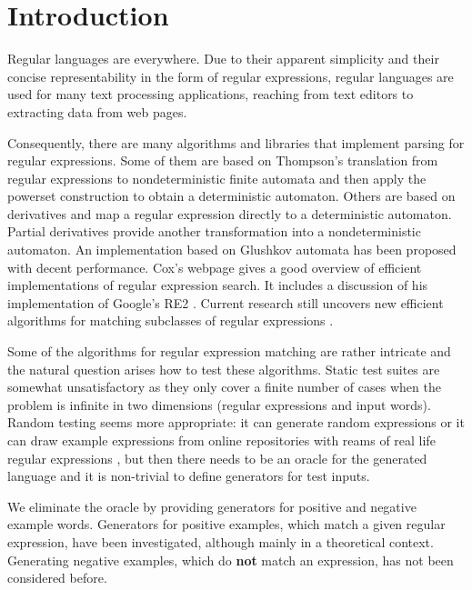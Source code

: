 \section{Introduction}

Regular languages are everywhere. Due to their apparent simplicity and
their concise representability in the form of regular expressions,
regular languages are used for many text processing
applications, reaching from text editors
\cite{DBLP:journals/cacm/Thompson68} to extracting data from web
pages.

Consequently, there are many algorithms and libraries that implement
parsing for regular expressions. Some of them are based on Thompson's
translation from regular expressions to nondeterministic finite
automata and then apply the powerset construction to obtain a
deterministic automaton. Others are based on derivatives
\cite{Brzozowski1964} and
map a regular expression directly to a deterministic
automaton. Partial derivatives \cite{Antimirov96Partial}
provide another transformation into a nondeterministic automaton. An
implementation based on Glushkov automata has been proposed
\cite{DBLP:conf/icfp/FischerHW10} with decent performance.
Cox's webpage \cite{cox07:_implem_regul_expres} gives a good overview
of efficient implementations of regular expression search. It includes
a discussion of his implementation of Google's RE2 \cite{cox10:_regul_expres_match_wild}.
Current research still uncovers new efficient algorithms for matching
subclasses of regular expressions \cite{DBLP:journals/jcss/GrozM17}.

Some of the algorithms for regular expression matching are rather
intricate and the natural question arises how to test these
algorithms. Static test suites are somewhat unsatisfactory as they
only cover a finite number of cases when the problem is infinite in
two dimensions (regular expressions and input words). Random testing
seems more appropriate: it can generate random expressions or it can
draw example expressions from online repositories with reams of real
life regular expressions \cite{regul_expres_librar}, but then there
needs to be an oracle for the generated language and it is non-trivial
to define generators for test inputs.

We eliminate the oracle by providing generators for positive and
negative example words. Generators for positive examples, which match
a given regular expression, have been
investigated\cite{DBLP:journals/jcss/GrozM17,
  DBLP:journals/tcs/AckermanS09, DBLP:journals/jfp/McIlroy04,
  DBLP:journals/actaC/Makinen97}, although mainly in a theoretical
context. Generating negative examples, which do \textbf{not} match an
expression, has not been considered before.

